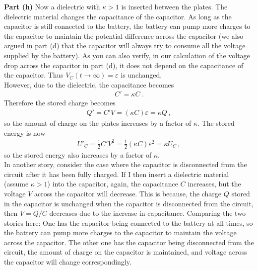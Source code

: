 \documentclass[11pt]{article}
\begin{document}
\noindent\textbf{Part (h)} Now a dielectric with $\kappa >1$ is inserted between the plates. The dielectric material changes the capacitance of the capacitor. As long as the capacitor is still connected to the battery, the battery can pump more charges to the capacitor to maintain the potential difference across the capacitor (we also argued in part (d) that the capacitor will always try to consume all the voltage supplied by the battery). As you can also verify, in our calculation of the voltage drop across the capacitor in part (d), it does not depend on the capacitance of the capacitor. Thus $V_C(t\to \infty)=\varepsilon$ is unchanged.\\

However, due to the dielectric, the capacitance becomes
\begin{align*}
C'=\kappa C\,.
\end{align*}
Therefore the stored charge becomes
\begin{align*}
Q'  =C'V= (\kappa C)\varepsilon = \kappa Q\,,
\end{align*}
so the amount of charge on the plates increases by a factor of $\kappa$. The stored energy is now
\begin{align*}
U'_C = \frac{1}{2}C'V^2
= \frac{1}{2}(\kappa C)\varepsilon^2
= \kappa U_C\,,
\end{align*}
so the stored energy also increases by a factor of $\kappa$.\\

In another story, consider the case where the capacitor is disconnected from the circuit after it has been fully charged. If I then insert a dielectric material (assume $\kappa>1$) into the capacitor, again, the capacitance $C$ increases, but the voltage $V$ across the capacitor will decrease. This is because, the charge $Q$ stored in the capacitor is unchanged when the capacitor is disconnected from the circuit, then $V=Q/C$ decreases due to the increase in capacitance. Comparing the two stories here: One has the capacitor being connected to the battery at all times, so the battery can pump more charges to the capacitor to maintain the voltage across the capacitor. The other one has the capacitor being disconnected from the circuit, the amount of charge on the capacitor is maintained, and voltage across the capacitor will change correspondingly. \\
\end{document}
